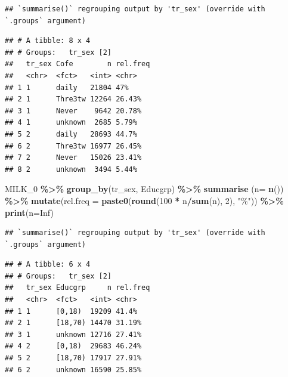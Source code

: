 \documentclass[
]{article}
\newenvironment{Shaded}{\begin{snugshade}}{\end{snugshade}}
\newcommand{\DataTypeTok}[1]{\textcolor[rgb]{0.13,0.29,0.53}{#1}}
\newcommand{\DecValTok}[1]{\textcolor[rgb]{0.00,0.00,0.81}{#1}}
\newcommand{\KeywordTok}[1]{\textcolor[rgb]{0.13,0.29,0.53}{\textbf{#1}}}
\newcommand{\NormalTok}[1]{#1}
\newcommand{\OperatorTok}[1]{\textcolor[rgb]{0.81,0.36,0.00}{\textbf{#1}}}
\newcommand{\OtherTok}[1]{\textcolor[rgb]{0.56,0.35,0.01}{#1}}
\newcommand{\StringTok}[1]{\textcolor[rgb]{0.31,0.60,0.02}{#1}}
\begin{document}
\begin{verbatim}
## `summarise()` regrouping output by 'tr_sex' (override with `.groups` argument)
\end{verbatim}

\begin{verbatim}
## # A tibble: 8 x 4
## # Groups:   tr_sex [2]
##   tr_sex Cofe        n rel.freq
##   <chr>  <fct>   <int> <chr>   
## 1 1      daily   21804 47%     
## 2 1      Thre3tw 12264 26.43%  
## 3 1      Never    9642 20.78%  
## 4 1      unknown  2685 5.79%   
## 5 2      daily   28693 44.7%   
## 6 2      Thre3tw 16977 26.45%  
## 7 2      Never   15026 23.41%  
## 8 2      unknown  3494 5.44%
\end{verbatim}

\begin{Shaded}
\begin{Highlighting}[]
\NormalTok{MILK\_}\DecValTok{0} \OperatorTok{\%\textgreater{}\%}\StringTok{ }
\StringTok{  }\KeywordTok{group\_by}\NormalTok{(tr\_sex, Educgrp) }\OperatorTok{\%\textgreater{}\%}\StringTok{ }
\StringTok{  }\KeywordTok{summarise}\NormalTok{ (}\DataTypeTok{n=} \KeywordTok{n}\NormalTok{()) }\OperatorTok{\%\textgreater{}\%}
\StringTok{  }\KeywordTok{mutate}\NormalTok{(}\DataTypeTok{rel.freq =} \KeywordTok{paste0}\NormalTok{(}\KeywordTok{round}\NormalTok{(}\DecValTok{100} \OperatorTok{*}\StringTok{ }\NormalTok{n}\OperatorTok{/}\KeywordTok{sum}\NormalTok{(n), }\DecValTok{2}\NormalTok{), }\StringTok{"\%"}\NormalTok{))  }\OperatorTok{\%\textgreater{}\%}\StringTok{ }
\StringTok{  }\KeywordTok{print}\NormalTok{(}\DataTypeTok{n=}\OtherTok{Inf}\NormalTok{)}
\end{Highlighting}
\end{Shaded}

\begin{verbatim}
## `summarise()` regrouping output by 'tr_sex' (override with `.groups` argument)
\end{verbatim}

\begin{verbatim}
## # A tibble: 6 x 4
## # Groups:   tr_sex [2]
##   tr_sex Educgrp     n rel.freq
##   <chr>  <fct>   <int> <chr>   
## 1 1      [0,18)  19209 41.4%   
## 2 1      [18,70) 14470 31.19%  
## 3 1      unknown 12716 27.41%  
## 4 2      [0,18)  29683 46.24%  
## 5 2      [18,70) 17917 27.91%  
## 6 2      unknown 16590 25.85%
\end{verbatim}
\end{document}
